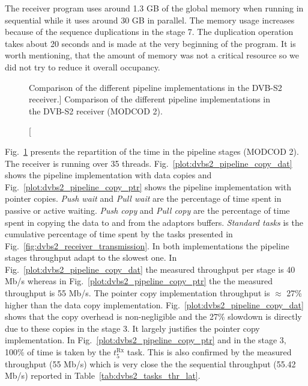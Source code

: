 The receiver program uses around 1.3 GB of the global memory when running in
sequential while it uses around 30 GB in parallel. The memory usage increases
because of the sequence duplications in the stage 7. The duplication operation
takes about 20 seconds and is made at the very beginning of the program. It is
worth mentioning, that the amount of memory was not a critical resource so we
did not try to reduce it overall occupancy.

\begin{figure}[htp]
  \centering
  \quad
  \caption
    [Comparison of the different pipeline implementations in the DVB-S2
     receiver.]
    {Comparison of the different pipeline implementations in the DVB-S2 receiver
     (MODCOD 2).}
  \label{plot:dvbs2_pipeline}
\end{figure}

Fig.~\ref{plot:dvbs2_pipeline} presents the repartition of the time in the
pipeline stages (MODCOD 2). The receiver is running over 35 threads.
Fig.~\ref{plot:dvbs2_pipeline_copy_dat} shows the pipeline implementation with
data copies and Fig.~\ref{plot:dvbs2_pipeline_copy_ptr} shows the pipeline
implementation with pointer copies. \emph{Push wait} and \emph{Pull wait} are
the percentage of time spent in passive or active waiting. \emph{Push copy} and
\emph{Pull copy} are the percentage of time spent in copying the data to and
from the adaptors buffers. \emph{Standard tasks} is the cumulative percentage of
time spent by the tasks presented in Fig.~\ref{fig:dvbs2_receiver_transmission}.
In both implementations the pipeline stages throughput adapt to the slowest one.
In Fig.~\ref{plot:dvbs2_pipeline_copy_dat} the measured throughput per stage is
40 Mb/s whereas in Fig.~\ref{plot:dvbs2_pipeline_copy_ptr} the the measured
throughput is 55 Mb/s. The pointer copy implementation throughput is $\approx$
27\% higher than the data copy implementation.
Fig.~\ref{plot:dvbs2_pipeline_copy_dat} shows that the copy overhead is
non-negligible and the 27\% slowdown is directly due to these copies in the
stage 3. It largely justifies the pointer copy implementation. In
Fig.~\ref{plot:dvbs2_pipeline_copy_ptr} and in the stage 3, 100\% of time is
taken by the $t^\text{Rx}_{5}$ task. This is also confirmed by the measured
throughput (55 Mb/s) which is very close the the sequential throughput (55.42
Mb/s) reported in Table~\ref{tab:dvbs2_tasks_thr_lat}.

